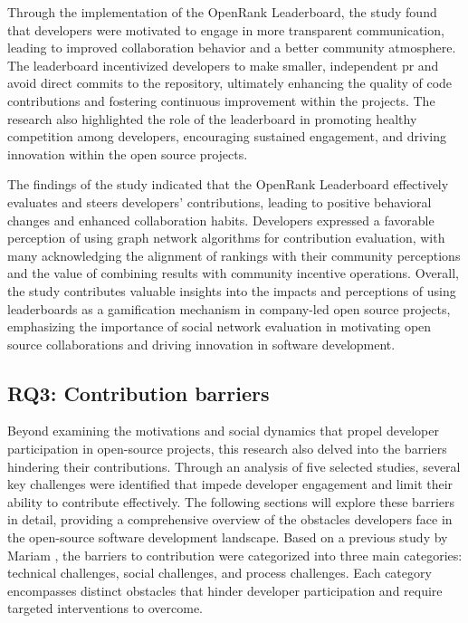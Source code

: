 Through the implementation of the OpenRank Leaderboard, the study found that developers were motivated to engage in more transparent communication, leading to improved collaboration behavior and a better community atmosphere. The leaderboard incentivized developers to make smaller, independent \ac{pr} and avoid direct commits to the repository, ultimately enhancing the quality of code contributions and fostering continuous improvement within the projects. The research also highlighted the role of the leaderboard in promoting healthy competition among developers, encouraging sustained engagement, and driving innovation within the open source projects.

The findings of the study indicated that the OpenRank Leaderboard effectively evaluates and steers developers' contributions, leading to positive behavioral changes and enhanced collaboration habits. Developers expressed a favorable perception of using graph network algorithms for contribution evaluation, with many acknowledging the alignment of rankings with their community perceptions and the value of combining results with community incentive operations. Overall, the study contributes valuable insights into the impacts and perceptions of using leaderboards as a gamification mechanism in company-led open source projects, emphasizing the importance of social network evaluation in motivating open source collaborations and driving innovation in software development.


\subsection{RQ3: Contribution barriers}

Beyond examining the motivations and social dynamics that propel developer participation in open-source projects, this research also delved into the barriers hindering their contributions. Through an analysis of five selected studies, several key challenges were identified that impede developer engagement and limit their ability to contribute effectively. The following sections will explore these barriers in detail, providing a comprehensive overview of the obstacles developers face in the open-source software development landscape. Based on a previous study by Mariam \citep{04guizani2021long}, the barriers to contribution were categorized into three main categories: technical challenges, social challenges, and process challenges. Each category encompasses distinct obstacles that hinder developer participation and require targeted interventions to overcome.


